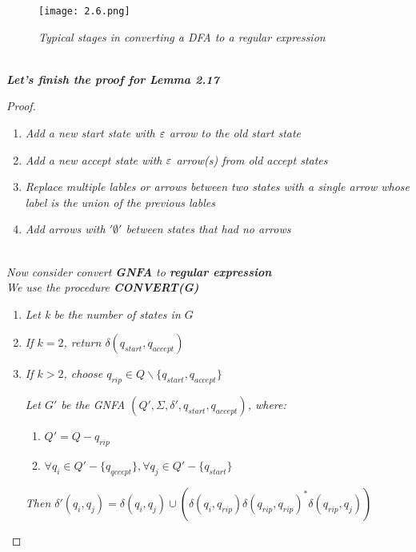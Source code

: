 \documentclass{article}
\begin{document}
\begin{figure}[H]
    \begin{center}
        \texttt{[image: 2.6.png]}
    \end{center}
    \caption{\textit{Typical stages in converting a DFA to a regular expression}}
\end{figure}

\textit{\textbf{\\Let's finish the proof for Lemma 2.17}}

\begin{proof}
    \
    \begin{enumerate}
        \item \textit{Add a new start state with $\varepsilon$ arrow to the old start state}
        \item \textit{Add a new accept state with $\varepsilon$ arrow(s) from old accept states}
        \item \textit{Replace multiple lables or arrows between two states with a single arrow whose label is the union of the previous lables}
        \item \textit{Add arrows with $'\emptyset'$ between states that had no arrows}
    \end{enumerate}
    \newpage
    \textit{\\Now consider convert \textbf{GNFA} to \textbf{regular expression}\\We use the procedure \textbf{CONVERT(G)}}
    \begin{enumerate}
        \item \textit{Let k be the number of states in $G$}
        \item \textit{If $k = 2$, return $\delta(q_{start},q_{accept})$}
        \item \textit{If $k > 2$, choose $q_{rip}\in Q \backslash \{q_{start},q_{accept}\} $}
    

    \textit{Let $G'$ be the GNFA $(Q', \Sigma, \delta', q_{start}, q_{accept})$, where:}

    \begin{enumerate}
        \item $Q' = Q-q_{rip}$
        \item $\forall q_i \in Q'-\{q_{qccept}\},\forall q_j \in Q'-\{q_{start}\}$
    \end{enumerate}

    \textit{Then $\delta'(q_i,q_j) = \delta(q_i,q_j)\cup(\delta(q_i,q_{rip})\delta(q_{rip},q_{rip})^*\delta(q_{rip},q_j))$}


\end{enumerate}
\end{proof}
\end{document}
